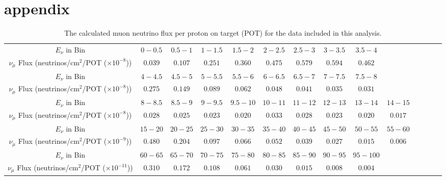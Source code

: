 \newcommand{\qsq}{\ensuremath{Q^2_{QE}}\xspace}
\renewcommand{\textfraction}{0.05}
\renewcommand{\topfraction}{0.95}
\renewcommand{\bottomfraction}{0.95}
\renewcommand{\floatpagefraction}{0.95}
\renewcommand{\dblfloatpagefraction}{0.95}
\renewcommand{\dbltopfraction}{0.95}
\setcounter{totalnumber}{5}
\setcounter{bottomnumber}{3}
\setcounter{topnumber}{3}
\setcounter{dbltopnumber}{3}

\ifdefined\PRLsupp
  \ifnum{}
    \newcommand{\SuppName}{appendix}
  \else
    \newcommand{\SuppName}{supplemental material}
  \fi
\else
  \newcommand{\SuppName}{supplemental material}
\fi


\section{\SuppName}

\begingroup
\squeezetable
\begin{table}[h]
\begin{tabular}{c|c c c c c c c c c c c c c}
\hline
\hline 
$E_\nu$ in Bin & 
$0 - 0.5$ &
$0.5 - 1$ &
$1 - 1.5$ &
$1.5 - 2$ &
$2 - 2.5$ &
$2.5 - 3$ &
$3 - 3.5$ &
$3.5 - 4$ \\
$\nu_\mu$ Flux
(neutrinos/cm$^2$/POT ($\times 10^{-8}$)) &
$0.039	$&
$0.107	$&
$0.251	$&
$0.360  $&
$0.475	$&
$0.579	$&
$0.594	$&
$0.462	$ \\
\hline
$E_\nu$ in Bin & 
$4 - 4.5$ &
$4.5 - 5$ &
$5 - 5.5$ &
$5.5 - 6$ &
$6 - 6.5$ &
$6.5 - 7$ &
$7 - 7.5$ &
$7.5 - 8$ \\
$\nu_\mu$ Flux
(neutrinos/cm$^2$/POT ($\times 10^{-8}$)) &
$0.275	$&
$0.149	$&
$0.089	$&
$0.062  $&
$0.048	$&
$0.041	$&
$0.035	$&
$0.031	$ \\
\hline
$E_\nu$ in Bin & 
$8 - 8.5$ &
$8.5 - 9$ &
$9 - 9.5$ &
$9.5 - 10$ &
$10 - 11$ &
$11 - 12$ &
$12 - 13$ &
$13 - 14$ &
$14 - 15$ \\
$\nu_\mu$ Flux
(neutrinos/cm$^2$/POT ($\times 10^{-8}$)) &
$0.028  $&
$0.025	$&
$0.023	$&
$0.020	$&
$0.033	$&
$0.028	$&
$0.023	$&
$0.020	$&
$0.017	$ \\ \hline
$E_\nu$ in Bin & 
$15 - 20$ &
$20 - 25$ &
$25 - 30$ &
$30 - 35$ &
$35 - 40$ &
$40 - 45$ &
$45 - 50$ &
$50 - 55$ &
$55 - 60$ \\
$\nu_\mu$ Flux
(neutrinos/cm$^2$/POT ($\times 10^{-9}$)) &
$0.480  $&
$0.204	$&
$0.097	$&
$0.066	$&
$0.052	$&
$0.039	$&
$0.027	$&
$0.015	$&
$0.006	$ \\ \hline
$E_\nu$ in Bin & 
$60 - 65$ &
$65 - 70$ &
$70 - 75$ &
$75 - 80$ &
$80 - 85$ &
$85 - 90$ &
$90 - 95$ &
$95 - 100$&
\\
$\nu_\mu$ Flux
(neutrinos/cm$^2$/POT ($\times 10^{-11}$)) &
$0.310  $&
$0.172	$&
$0.108	$&
$0.061	$&
$0.030	$&
$0.015  $&
$0.008	$&
$0.004	$&
\\ 
\hline
\hline
\end{tabular}
\caption{The calculated muon neutrino flux per proton on target (POT) for the data included in this analysis.}
\end{table}
\endgroup

